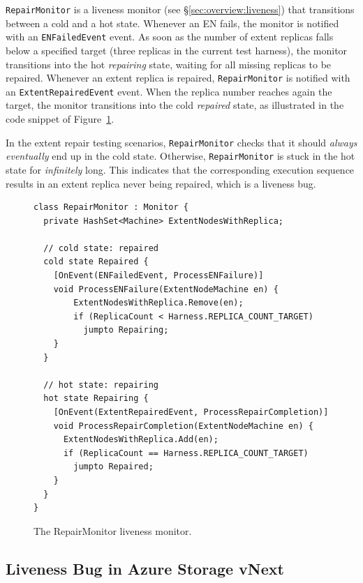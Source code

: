 \texttt{RepairMonitor} is a \psharp liveness monitor (see \S\ref{sec:overview:liveness}) that transitions between a cold and a hot state. Whenever an EN fails, the monitor is notified with an \texttt{ENFailedEvent} event. As soon as the number of extent replicas falls below a specified target (three replicas in the current \psharp test harness), the monitor transitions into the hot \emph{repairing} state, waiting for all missing replicas to be repaired. Whenever an extent replica is repaired, \texttt{RepairMonitor} is notified with an \texttt{ExtentRepairedEvent} event. When the replica number reaches again the target, the monitor transitions into the cold \emph{repaired} state, as illustrated in the code snippet of Figure~\ref{fig:monitor}.

In the extent repair testing scenarios, \texttt{RepairMonitor} checks that it should \emph{always eventually} end up in the cold state. Otherwise, \texttt{RepairMonitor} is stuck in the hot state for \emph{infinitely} long. This indicates that the corresponding execution sequence results in an extent replica never being repaired, which is a liveness bug.

\begin{figure}[t]
\begin{lstlisting}
class RepairMonitor : Monitor {
  private HashSet<Machine> ExtentNodesWithReplica;

  // cold state: repaired
  cold state Repaired {
    [OnEvent(ENFailedEvent, ProcessENFailure)]
    void ProcessENFailure(ExtentNodeMachine en) {
        ExtentNodesWithReplica.Remove(en);
        if (ReplicaCount < Harness.REPLICA_COUNT_TARGET)				
          jumpto Repairing;
    }
  }

  // hot state: repairing
  hot state Repairing {
    [OnEvent(ExtentRepairedEvent, ProcessRepairCompletion)]
    void ProcessRepairCompletion(ExtentNodeMachine en) {
      ExtentNodesWithReplica.Add(en);
      if (ReplicaCount == Harness.REPLICA_COUNT_TARGET)
        jumpto Repaired;
    }
  }
}
\end{lstlisting}
\vspace{-5mm}
\caption{The RepairMonitor liveness monitor.}
\label{fig:monitor}
\vspace{-2mm}
\end{figure}

\subsection{Liveness Bug in Azure Storage vNext}
\label{sec:method:azurestore}

